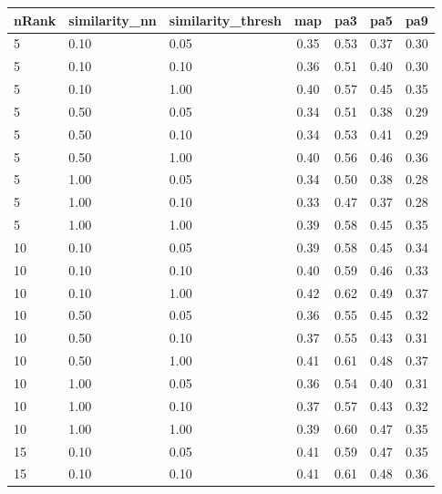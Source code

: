 \documentclass[12pt,a4paper,fleqn]{tufte-handout}
\begin{document}
 
\begin{table}                    
\begin{center}                    
\scriptsize                    
\setlength{\tabcolsep}{.16667em}                    
\begin{tabular}{lllcccc}                    
nRank & similarity\_nn & similarity\_thresh & map & pa3 & pa5 & pa9 \\                    
\hline                    
5 & 0.10 & 0.05 & 0.35 & 0.53 & 0.37 & 0.30 \\                    
5 & 0.10 & 0.10 & 0.36 & 0.51 & 0.40 & 0.30 \\                    
5 & 0.10 & 1.00 & 0.40 & 0.57 & 0.45 & 0.35 \\                    
5 & 0.50 & 0.05 & 0.34 & 0.51 & 0.38 & 0.29 \\                    
5 & 0.50 & 0.10 & 0.34 & 0.53 & 0.41 & 0.29 \\                    
5 & 0.50 & 1.00 & 0.40 & 0.56 & 0.46 & 0.36 \\                    
5 & 1.00 & 0.05 & 0.34 & 0.50 & 0.38 & 0.28 \\                    
5 & 1.00 & 0.10 & 0.33 & 0.47 & 0.37 & 0.28 \\                    
5 & 1.00 & 1.00 & 0.39 & 0.58 & 0.45 & 0.35 \\                    
10 & 0.10 & 0.05 & 0.39 & 0.58 & 0.45 & 0.34 \\                    
10 & 0.10 & 0.10 & 0.40 & 0.59 & 0.46 & 0.33 \\                    
10 & 0.10 & 1.00 & 0.42 & 0.62 & 0.49 & 0.37 \\                    
10 & 0.50 & 0.05 & 0.36 & 0.55 & 0.45 & 0.32 \\                    
10 & 0.50 & 0.10 & 0.37 & 0.55 & 0.43 & 0.31 \\                    
10 & 0.50 & 1.00 & 0.41 & 0.61 & 0.48 & 0.37 \\                    
10 & 1.00 & 0.05 & 0.36 & 0.54 & 0.40 & 0.31 \\                    
10 & 1.00 & 0.10 & 0.37 & 0.57 & 0.43 & 0.32 \\                    
10 & 1.00 & 1.00 & 0.39 & 0.60 & 0.47 & 0.35 \\                    
15 & 0.10 & 0.05 & 0.41 & 0.59 & 0.47 & 0.35 \\                    
15 & 0.10 & 0.10 & 0.41 & 0.61 & 0.48 & 0.36 \\                    

\end{tabular}
\end{center}
\end{table}
\end{document}
